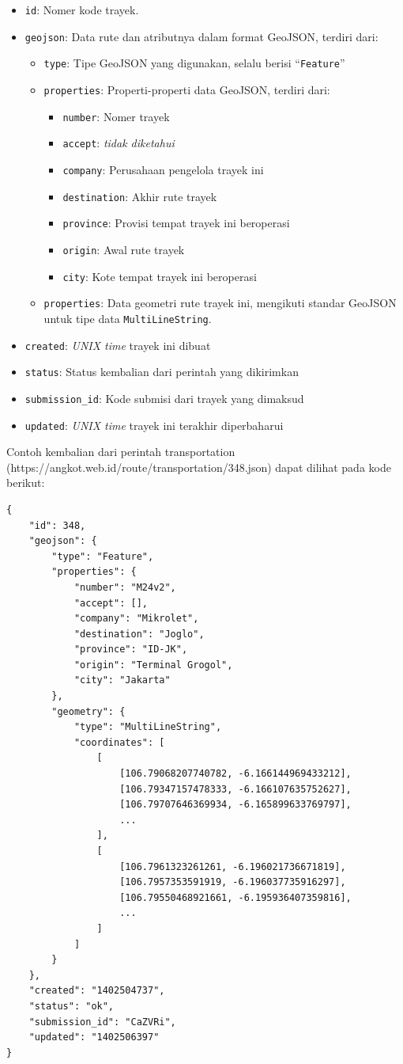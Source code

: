\begin{itemize}
	\item \texttt{id}: Nomer kode trayek.
	\item \texttt{geojson}: Data rute dan atributnya dalam format GeoJSON, terdiri dari:
		\begin{itemize}
			\item \texttt{type}: Tipe GeoJSON yang digunakan, selalu berisi ``\texttt{Feature}''
			\item \texttt{properties}: Properti-properti data GeoJSON, terdiri dari:
				\begin{itemize}
					\item \texttt{number}: Nomer trayek
					\item \texttt{accept}: \textit{tidak diketahui}
					\item \texttt{company}: Perusahaan pengelola trayek ini
					\item \texttt{destination}: Akhir rute trayek
					\item \texttt{province}: Provisi tempat trayek ini beroperasi
					\item \texttt{origin}: Awal rute trayek
					\item \texttt{city}: Kote tempat trayek ini beroperasi
				\end{itemize}
			\item \texttt{properties}: Data geometri rute trayek ini, mengikuti standar GeoJSON untuk tipe data \texttt{MultiLineString}.
		\end{itemize}
	\item \texttt{created}: \textit{UNIX time} trayek ini dibuat
	\item \texttt{status}: Status kembalian dari perintah yang dikirimkan
	\item \texttt{submission\_id}: Kode submisi dari trayek yang dimaksud
	\item \texttt{updated}: \textit{UNIX time} trayek ini terakhir diperbaharui
\end{itemize}

Contoh kembalian dari perintah transportation (https://angkot.web.id/route/transportation/348.json) dapat dilihat pada kode berikut:

\begin{lstlisting}
{
	"id": 348,
	"geojson": {
		"type": "Feature",
		"properties": {
			"number": "M24v2",
			"accept": [],
			"company": "Mikrolet",
			"destination": "Joglo",
			"province": "ID-JK",
			"origin": "Terminal Grogol",
			"city": "Jakarta"
		},
		"geometry": {
			"type": "MultiLineString",
			"coordinates": [
				[
					[106.79068207740782, -6.166144969433212],
					[106.79347157478333, -6.166107635752627],
					[106.79707646369934, -6.165899633769797],
					...
				],
				[
					[106.7961323261261, -6.196021736671819],
					[106.7957353591919, -6.196037735916297],
					[106.79550468921661, -6.195936407359816],
					...
				]
			]
		}
	},
	"created": "1402504737",
	"status": "ok",
	"submission_id": "CaZVRi",
	"updated": "1402506397"
}
\end{lstlisting}
